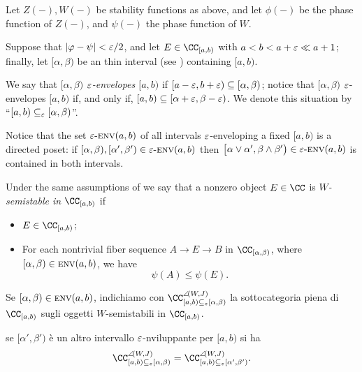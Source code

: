 \hrulefill
\begin{definition}\label{e-envelopes}
Let $Z(-),W(-)$ be stability functions as above, and let $\phi(-)$ be the phase function of $Z(-)$, and $\psi(-)$ the phase function of $W$.

Suppose that $|\varphi-\psi|<\varepsilon /2$, and let $E\in\cab$ with $a<b<a+\varepsilon \ll a+1$; finally, let $[\alpha,\beta)$ be an thin interval (see \adef {}) containing $[a,b)$.

We say that $[\alpha,\beta)$ \emph{$\varepsilon $-envelopes $[a,b)$} if $[a-\varepsilon ,b+\varepsilon )\subseteq [\alpha,\beta)$; notice that $[\alpha,\beta)$ $\varepsilon $-envelopes $[a,b)$ if, and only if, $[a,b)\subseteq [\alpha+\varepsilon, \beta-\varepsilon)$. We denote this situation by ``$[a,b)\subseteq_\varepsilon  [\alpha,\beta)$''.
\end{definition}
\begin{remark}\label{is-directed}
Notice that the set $\varepsilon\text{-}\textsc{env}(a,b)$ of all intervals $\varepsilon$-enveloping a fixed $[a,b)$ is a directed poset: if $[\alpha,\beta), [\alpha',\beta') \in \varepsilon\text{-}\textsc{env}(a,b)$ then $\big[\alpha \vee \alpha', \beta\land \beta'\big) \in \varepsilon\text{-}\textsc{env}(a,b)$ is contained in both intervals.
\end{remark}
\begin{definition}\label{w.semistables.in.thin}
Under the same assumptions of \adef {} we say that a nonzero object $E\in\CC$ is \emph{$W$-semistable in $\cab$} if
\begin{itemize}
\item $E\in \cab$;
\item For each nontrivial fiber sequence $A\to E\to B$ in $\CC_{[\alpha,\beta)}$, where $[\alpha,\beta)\in\textsc{env}(a,b)$, we have \[\psi(A)\leq \psi(E).\]
\end{itemize}
\end{definition}
\begin{notat}
Se $[\alpha,\beta)\in\textsc{env}(a,b)$, indichiamo con $\CC^{\semi(W,J)}_{[a,b)\subseteq_\eps  [\alpha,\beta)}$ la sottocategoria piena di $\cab$ sugli oggetti $W$-semistabili in $\cab$.
\end{notat}
\begin{proposition}\label{the.fact}
se $[\alpha',\beta')$ \`e un altro intervallo $\varepsilon $\hyp{}nviluppante per $[a,b)$ si ha
\[
\CC^{\semi(W,J)}_{[a,b)\subseteq_\eps  [\alpha,\beta)}=\CC^{\semi(W,J)}_{[a,b)\subseteq_\eps  [\alpha',\beta')}.
\]
\end{proposition}
